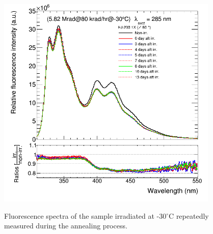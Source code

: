 \documentclass[review]{elsarticle}
\begin{document}
\begin{figure}[!ht]
	\centering
	\caption{Fluorescence spectra of the sample irradiated at -30$^\circ$C repeatedly measured during the annealing process.}
	\includegraphics[width=300pt]{./figures/appendix2.png}
	\label{fig:app2}
\end{figure}



{}






\end{document}
